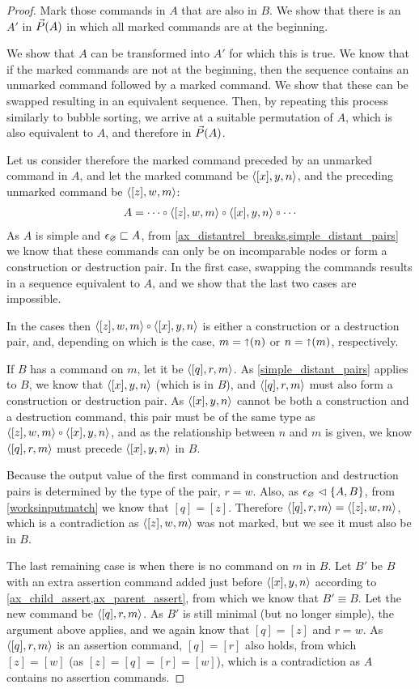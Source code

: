 \begin{proof}
Mark those commands in $A$ that are also in $B$.
We show that
there is an $A'$ in $\vec{P}({A})$ in which all marked commands are at the beginning.

We show that $A$ can be transformed into $A'$ for which this is true.
We know that if the marked commands are not at the beginning, then
the sequence contains an unmarked command followed by a marked command.
We show that these can be swapped resulting in an equivalent sequence.
Then, by repeating this process similarly to bubble sorting, we arrive at 
a suitable permutation of $A$, which is also equivalent to $A$, and therefore in $\vec{P}({A})$.

Let us consider therefore the marked command preceded by an unmarked command in $A$,
and let the marked command be $\langle{[x],y,n}\rangle$, 
and the preceding unmarked command be $\langle{[z],w,m}\rangle$:
\begin{gather*}
A = \cdots\cc  \czwmv\cc  \cxynv\cc  \cdots
\end{gather*}
As $A$ is simple and $\epsilon_\varnothing\sqsubset{A}$, from 
\cref{ax_distantrel_breaks,simple_distant_pairs}
we know that these commands can only be on incomparable nodes or form a construction or destruction pair.
In the first case, swapping the commands results in a sequence equivalent to $A$,
and we show that the last two cases are impossible.

In the cases then $\czwmv\cc\cxynv$ is either a construction or a destruction pair,
and, depending on which is the case,
$m=\mathord{\shortuparrow}(n)$ or $n=\mathord{\shortuparrow}(m)$, respectively.

If $B$ has a command on $m$, let it be $\langle{[q],r,m}\rangle$.
As \cref{simple_distant_pairs} applies to $B$, we know that
$\langle{[x],y,n}\rangle$ (which is in $B$), and $\langle{[q],r,m}\rangle$ must also form a construction
or destruction pair.
As $\langle{[x],y,n}\rangle$ cannot be both a construction and a destruction command,
this pair must be of the same type as $\czwmv\cc\cxynv$,
and as the relationship between $n$ and $m$ is given,
we know $\langle{[q],r,m}\rangle$ must precede $\langle{[x],y,n}\rangle$ in $B$.

Because the output value of the first command in construction
and destruction pairs is determined by the type of the pair,
$r=w$.
Also, as ${\epsilon_\varnothing}\vartriangleleft{\{{A,B}\}}$, 
from \cref{worksinputmatch}
we know that $[q]=[z]$.
Therefore $\langle{[q],r,m}\rangle=\langle{[z],w,m}\rangle$,
which is a contradiction as $\langle{[z],w,m}\rangle$ was not marked,
but we see it must also be in $B$.

The last remaining case is when there is no command on $m$ in $B$.
Let $B'$ be $B$
with an extra assertion command added just before $\langle{[x],y,n}\rangle$
according to \cref{ax_child_assert,ax_parent_assert}, 
from which we know that $B'\equiv B$.
Let the new command be $\langle{[q],r,m}\rangle$.
As $B'$ is still minimal (but no longer simple),
the argument above applies, and we again know
that $[q]=[z]$ and $r=w$.
As $\langle{[q],r,m}\rangle$ is an assertion command, $[q]=[r]$ also holds,
from which $[z]=[w]$ (as $[z]=[q]=[r]=[w]$), which is a contradiction
as $A$ contains no assertion commands.
\end{proof}

